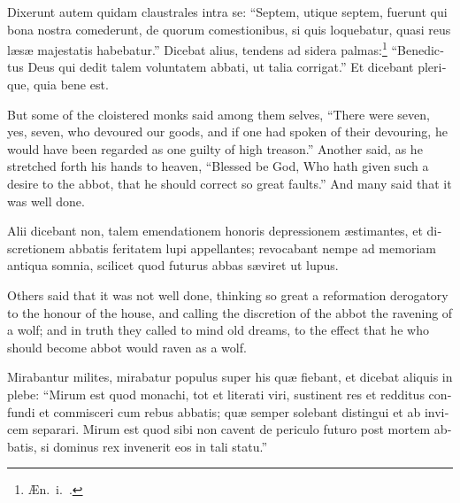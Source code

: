 \documentclass{book}
\begin{document}
\begin{paracol}{2}
\switchcolumn*

\begin{otherlanguage}{latin}
Dixerunt autem quidam claustrales intra se: ``Septem, utique septem, fuerunt qui bona nostra comederunt, de quorum comestionibus, si quis loquebatur, quasi reus l\ae{}s\ae{} majestatis habebatur.'' Dicebat alius, tendens ad sidera palmas:\footnote[\textdagger]{\AE{}n.\ i.\ .} ``Benedictus Deus qui dedit talem voluntatem abbati, ut talia corrigat.'' Et dicebant plerique, quia bene est. 
\end{otherlanguage}

\switchcolumn

But some of the cloistered monks said among them selves, ``There were seven, yes, seven, who devoured our goods, and if one had spoken of their devouring, he would have been regarded as one guilty of high treason.'' Another said, as he stretched forth his hands to heaven, ``Blessed be God, Who hath given such a desire to the abbot, that he should correct so great faults.'' And many said that it was well done.

\switchcolumn*

\begin{otherlanguage}{latin}
Alii dicebant non, talem emendationem honoris depressionem \ae{}stimantes, et discretionem abbatis feritatem lupi appellantes; revocabant nempe ad memoriam antiqua somnia, scilicet quod futurus abbas s\ae{}viret ut lupus.
\end{otherlanguage}

\switchcolumn

Others said that it was not well done, thinking so great a reformation derogatory to the honour of the house, and calling the discretion of the abbot the ravening of a wolf; and in truth they called to mind old dreams, to the effect that he who should become abbot would raven as a wolf.

\switchcolumn*

\begin{otherlanguage}{latin}
Mirabantur milites, mirabatur populus super his qu\ae{} fiebant, et dicebat aliquis in plebe: ``Mirum est quod monachi, tot et literati viri, sustinent res et redditus confundi et commisceri cum rebus abbatis; qu\ae{} semper solebant distingui et ab invicem separari. Mirum est quod sibi non cavent de periculo futuro post mortem abbatis, si dominus rex invenerit eos in tali statu.''
\end{otherlanguage}

\switchcolumn


\end{paracol}
\end{document}
